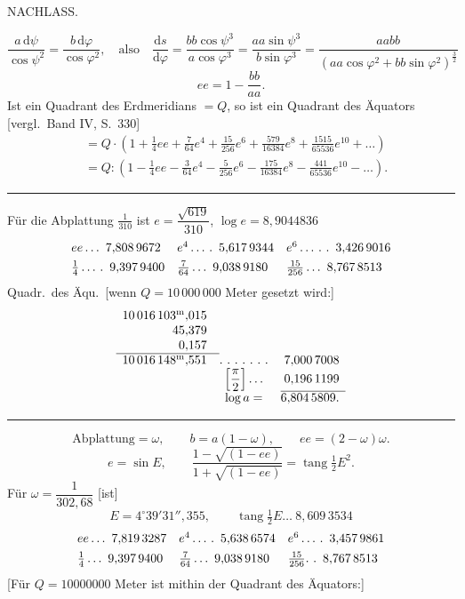 \clearpage
{}\hfill NACHLASS.\hfill\mbox{}\par
\[
\frac{a\,\mathrm d\psi}{\cos\psi^2}=\frac{b\,\mathrm d\varphi}{\cos\varphi^2},\quad\text{also}\quad\frac{\mathrm ds}{\mathrm d\varphi}=\frac{bb\cos\psi^3}{a\cos\varphi^3}=\frac{aa\sin\psi^3}{b\sin\varphi^3}=\frac{aabb}{(aa\cos\varphi^2+bb\sin\varphi^2)^{\frac32}}
\]
\[
ee=1-\frac{bb}{aa}.
\]
Ist ein Quadrant des Erdmeridians $=Q$, so ist ein Quadrant des Äquators [vergl.\ Band IV, S.\ 330]
\[
\begin{aligned}
&=Q\cdot(1+\tfrac14ee+\tfrac7{64}e^4+\tfrac{15}{256}e^6+\tfrac{579}{16384}e^8+\tfrac{1515}{65536}e^{10}+\ldots)\\
&=Q:(1-\tfrac14ee-\tfrac3{64}e^4-\tfrac5{256}e^6-\tfrac{175}{16384}e^8-\tfrac{441}{65536}e^{10}-\ldots).
\end{aligned}
\]
\begin{center}\rule{.25\textwidth}{.4pt}\end{center}
Für die Abplattung $\tfrac1{310}$ ist $e=\dfrac{\sqrt{619}}{310}$, $\log e=8{,}9044836$
\[
\begin{array}{l@{\quad}l@{\quad}l}
ee\ldots\ 7{,}808\,9672&e^4\ldots\,\ldotp\ 5{,}617\,9344&e^6\ldots\,\ldotp\,\ldotp\ 3{,}426\,9016\\[4pt]
\tfrac14\ldots\,\ldotp\ 9{,}397\,9400&\tfrac7{64}\ldots\ 9{,}038\,9180&\tfrac{15}{256}\ldots\ 8{,}767\,8513
\end{array}
\]
Quadr.\ des Äqu.\ [wenn $Q=10\,000\,000$ Meter gesetzt wird:]
\[
\begin{array}{r@{\quad}c@{\quad}r}
10\,016\,103^{\mathrm m}{,}015&&\\
45{,}379&&\\
0{,}157&&\\\cline{1-1}
10\,016\,148^{\mathrm m}{,}551&\ldotp\,\ldotp\,\ldotp\,\ldotp\,\ldotp\,\ldotp\,\ldotp&7{,}000\,7008\\
&\left[\dfrac\pi2\right]\ldots&0{,}196\,1199\\\cline{3-3}
&\log a=&6{,}804\,5809.
\end{array}
\]
\begin{center}\rule{.25\textwidth}{.4pt}\end{center}
\[
\text{Abplattung}=\omega,\qquad b=a(1-\omega),\qquad ee=(2-\omega)\omega.
\]
\[
e=\sin E,\qquad\frac{1-\sqrt{(1-ee)}}{1+\sqrt{(1-ee)}}=\operatorname{tang}\tfrac12E^2.
\]
Für $\omega=\dfrac1{302{,}68}$ [ist]
\[
E=4^\circ39'31''{,}355,\qquad\operatorname{tang}\tfrac12E\ldots\ 8{,}609\,3534
\]
\[
\begin{array}{l@{\quad}l@{\quad}l}
ee\ldots\ 7{,}819\,3287&e^4\ldots\,\ldotp\ 5{,}638\,6574&e^6\ldots\,\ldotp\ 3{,}457\,9861\\[4pt]
\tfrac14\ldots\ 9{,}397\,9400&\tfrac7{64}\ldots\ 9{,}038\,9180&\tfrac{15}{256}\ldotp\,\ldotp\ 8{,}767\,8513
\end{array}
\]
[Für $Q=10000000$ Meter ist mithin der Quadrant des Äquators:]

